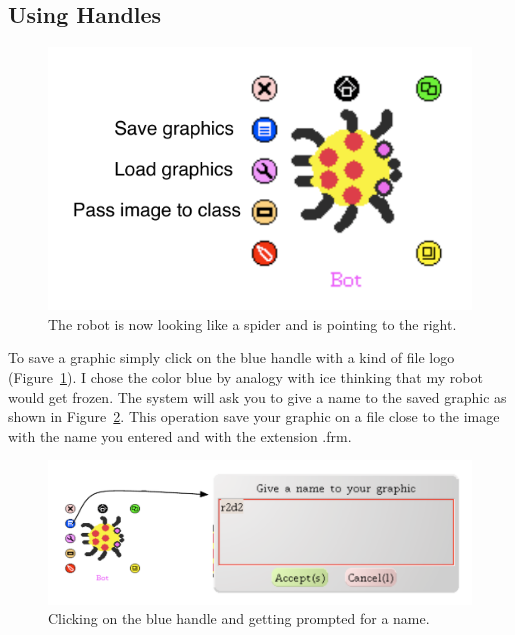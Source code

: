 \subsection{Using Handles}

\begin{figure}[h]
\begin{center}
\includegraphics{PicaHaloSaveAndLoadAnnotated}
\end{center}
\caption{The robot is now looking like a spider and is pointing to the right. \label{fig:PicaHaloSaveAndLoadAnnotated}}
\end{figure}

To save a graphic simply click on the blue handle with a kind of file logo (Figure~\ref{fig:PicaHaloSaveAndLoadAnnotated}). I chose the color blue by analogy with ice thinking that my robot would 
get frozen. The system will ask you to give a name to the saved graphic as shown in Figure~\ref{fig:prompt}.
This  operation save your graphic on a file close to the \sq image with the name you entered and with the extension .frm. 

\begin{figure}[h]
\begin{center}
\includegraphics{nameOfSaveAnnotated}
\end{center}
\caption{Clicking on the blue handle and getting prompted for a name. \label{fig:prompt}}
\end{figure}

